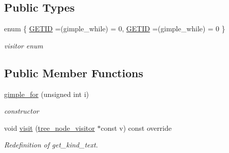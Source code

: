 \subsection*{Public Types}
\begin{DoxyCompactItemize}
\item 
enum \{ \hyperlink{structgimple__for_a9f1d57e1e9600928ebaad063f76a8c9ea179f1a5a5820a76fb24ecd5341df4861}{G\+E\+T\+ID} =(gimple\+\_\+while) = 0, 
\hyperlink{structgimple__for_a9f1d57e1e9600928ebaad063f76a8c9ea179f1a5a5820a76fb24ecd5341df4861}{G\+E\+T\+ID} =(gimple\+\_\+while) = 0
 \}\begin{DoxyCompactList}\small\item\em visitor enum \end{DoxyCompactList}
\end{DoxyCompactItemize}
\subsection*{Public Member Functions}
\begin{DoxyCompactItemize}
\item 
\hyperlink{structgimple__for_a212f7b45c5b79e8dd70ab01d70b91f5a}{gimple\+\_\+for} (unsigned int i)
\begin{DoxyCompactList}\small\item\em constructor \end{DoxyCompactList}\item 
void \hyperlink{structgimple__for_a582c8e3f0d70da9d0c1e8365eb56836d}{visit} (\hyperlink{classtree__node__visitor}{tree\+\_\+node\+\_\+visitor} $\ast$const v) const override
\begin{DoxyCompactList}\small\item\em Redefinition of get\+\_\+kind\+\_\+text. \end{DoxyCompactList}\end{DoxyCompactItemize}
